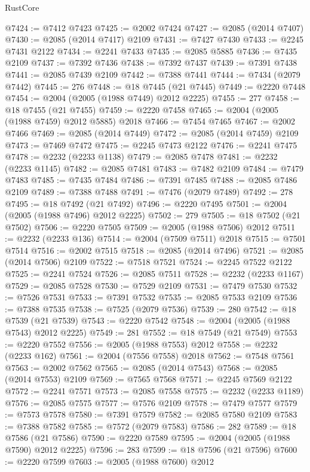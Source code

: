 \begin{lexlean}{RustCore}
\begin{coremodule}
@7424 := @7412 @7423
@7425 := @2002 @7424
@7427 := @2085 (@2014 @7407)
@7430 := @2085 (@2014 @7417) @2109
@7431 := @7427 @7430
@7433 := @2245 @7431 @2122
@7434 := @2241 @7433
@7435 := @2085 @5885
@7436 := @7435 @2109
@7437 := @7392 @7436
@7438 := @7392 @7437
@7439 := @7391 @7438
@7441 := @2085 @7439 @2109
@7442 := @7388 @7441
@7444 := @7434 (@2079 @7442)
@7445 := 276
@7448 := @18 @7445 (@21 @7445)
@7449 := @2220 @7448
@7454 := @2004 (@2005 (@1988 @7449) @2012 @2225)
@7455 := 277
@7458 := @18 @7455 (@21 @7455)
@7459 := @2220 @7458
@7465 := @2004 (@2005 (@1988 @7459) @2012 @5885) @2018
@7466 := @7454 @7465
@7467 := @2002 @7466
@7469 := @2085 (@2014 @7449)
@7472 := @2085 (@2014 @7459) @2109
@7473 := @7469 @7472
@7475 := @2245 @7473 @2122
@7476 := @2241 @7475
@7478 := @2232 (@2233 @1138)
@7479 := @2085 @7478
@7481 := @2232 (@2233 @1145)
@7482 := @2085 @7481
@7483 := @7482 @2109
@7484 := @7479 @7483
@7485 := @7435 @7484
@7486 := @7391 @7485
@7488 := @2085 @7486 @2109
@7489 := @7388 @7488
@7491 := @7476 (@2079 @7489)
@7492 := 278
@7495 := @18 @7492 (@21 @7492)
@7496 := @2220 @7495
@7501 := @2004 (@2005 (@1988 @7496) @2012 @2225)
@7502 := 279
@7505 := @18 @7502 (@21 @7502)
@7506 := @2220 @7505
@7509 := @2005 (@1988 @7506) @2012
@7511 := @2232 (@2233 @136)
@7514 := @2004 (@7509 @7511) @2018
@7515 := @7501 @7514
@7516 := @2002 @7515
@7518 := @2085 (@2014 @7496)
@7521 := @2085 (@2014 @7506) @2109
@7522 := @7518 @7521
@7524 := @2245 @7522 @2122
@7525 := @2241 @7524
@7526 := @2085 @7511
@7528 := @2232 (@2233 @1167)
@7529 := @2085 @7528
@7530 := @7529 @2109
@7531 := @7479 @7530
@7532 := @7526 @7531
@7533 := @7391 @7532
@7535 := @2085 @7533 @2109
@7536 := @7388 @7535
@7538 := @7525 (@2079 @7536)
@7539 := 280
@7542 := @18 @7539 (@21 @7539)
@7543 := @2220 @7542
@7548 := @2004 (@2005 (@1988 @7543) @2012 @2225)
@7549 := 281
@7552 := @18 @7549 (@21 @7549)
@7553 := @2220 @7552
@7556 := @2005 (@1988 @7553) @2012
@7558 := @2232 (@2233 @162)
@7561 := @2004 (@7556 @7558) @2018
@7562 := @7548 @7561
@7563 := @2002 @7562
@7565 := @2085 (@2014 @7543)
@7568 := @2085 (@2014 @7553) @2109
@7569 := @7565 @7568
@7571 := @2245 @7569 @2122
@7572 := @2241 @7571
@7573 := @2085 @7558
@7575 := @2232 (@2233 @1189)
@7576 := @2085 @7575
@7577 := @7576 @2109
@7578 := @7479 @7577
@7579 := @7573 @7578
@7580 := @7391 @7579
@7582 := @2085 @7580 @2109
@7583 := @7388 @7582
@7585 := @7572 (@2079 @7583)
@7586 := 282
@7589 := @18 @7586 (@21 @7586)
@7590 := @2220 @7589
@7595 := @2004 (@2005 (@1988 @7590) @2012 @2225)
@7596 := 283
@7599 := @18 @7596 (@21 @7596)
@7600 := @2220 @7599
@7603 := @2005 (@1988 @7600) @2012

\end{coremodule}
\end{lexlean}
